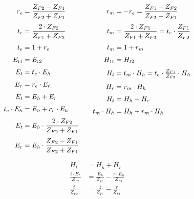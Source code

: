 \begin{equation*}
	\setlength{\jot}{6pt}
	\begin{aligned}[t]
        r_e & = \frac{Z_{F2}-Z_{F1}}{Z_{F2} + Z_{F1}} \\
        t_e & = \frac{2 \cdot Z_{F2}}{Z_{F1} + Z_{F2}} \\
		t_e            & = 1+ r_e                                           \\
		E_{t1}         & =E_{t2}                                            \\
		E_t            & = t_e \cdot E_h                                    \\
		E_r            & = r_e \cdot E_h                                    \\
		E_t            & = E_h + E_r                                        \\
		t_e\cdot E_{h} & = E_{h} + r_e\cdot  E_{h}                          \\
		E_t            & = E_h \cdot \frac{2 \cdot Z_{F2}}{Z_{F2} + Z_{F1}} \\
		E_r            & = E_h \cdot \frac{Z_{F2}-Z_{F1}}{Z_{F2}+Z_{F1}}
	\end{aligned}
	\qquad
	\begin{aligned}[t]
        r_m & =-r_e  = \frac{Z_{F1}-Z_{F2}}{Z_{F2} + Z_{F1}}          \\
        t_m & = \frac{2 \cdot Z_{F1}}{Z_{F1} + Z_{F2}} = t_e \cdot \frac{Z_{F1}}{Z_{F2}}   \\
		t_m            & = 1+ r_m                                                      \\
		H_{t1}         & = H_{t2}                                                      \\
		H_t            & = t_m \cdot H_h  = t_e \cdot \tfrac{Z_{F1}}{Z_{F2}} \cdot H_h \\
		H_r            & = r_m \cdot H_h                                               \\
		H_t            & = H_h + H_r                                                   \\
		t_m\cdot H_{h} & = H_{h} + r_m\cdot  H_{h}                                     \\
	\end{aligned}
\end{equation*}

\begin{align*}
	H_t                         & = H_h + H_r                                          \\
	\frac{t\cdot E_{h}}{Z_{F2}} & = \frac{E_{h}}{Z_{F1}} - \frac{r\cdot E_{h}}{Z_{F1}} \\
	\frac{t}{Z_{F2}}            & = \frac{1}{Z_{F1}} - \frac{r}{Z_{F1}}
\end{align*}

